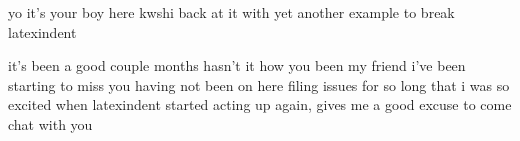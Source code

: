 \begin{myfriendhowareyou}
	yo it's your boy here kwshi back at it with yet another
	example to break latexindent
\end{myfriendhowareyou}
it's been a good couple months
                       hasn't it how you been my friend
                       i've been starting to miss you
                       having not been on here filing
                       issues for so long that i was so
                       excited when latexindent started
                       acting up again, gives me a good
                       excuse to come chat with you
